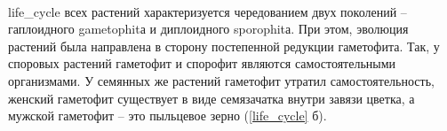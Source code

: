 
\paragraph*{}\gls{life_cycle} всех растений характеризуется чередованием двух поколений -- гаплоидного \gls{gametophit}а и диплоидного \gls{sporophit}а. При этом, эволюция растений была направлена в сторону постепенной редукции гаметофита. Так, у споровых растений гаметофит и спорофит являются самостоятельными организмами. У семянных же растений гаметофит утратил самостоятельность, женский гаметофит существует в виде семязачатка внутри завязи цветка, а мужской гаметофит -- это пыльцевое зерно (\ris \ref{life_cycle} б).


